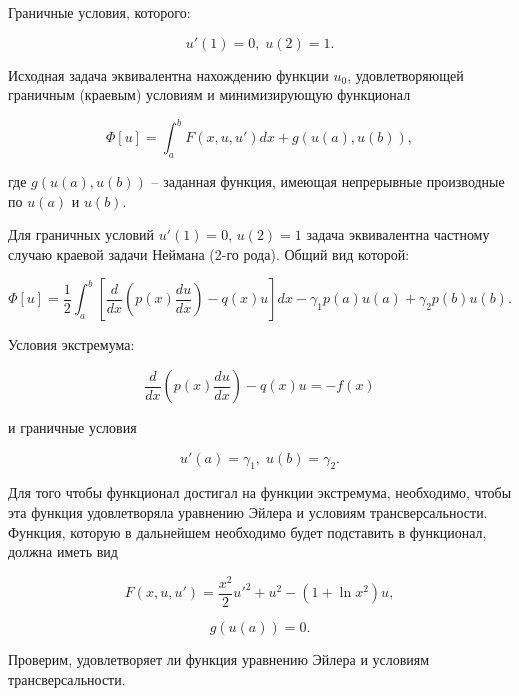 \documentclass{article}
\begin{document}
\noindent Граничные условия, которого:

\begin{displaymath}
	u'(1) = 0, \; u(2) = 1.
\end{displaymath}

Исходная задача эквивалентна нахождению функции $u_{0}$, удовлетворяющей граничным (краевым) условиям и минимизирующую функционал

\begin{displaymath}
	\Phi[u] = \int_{a}^{b} F(x, u, u')dx + g(u(a), u(b)),
\end{displaymath}

\noindent где $g(u(a), u(b))$ -- заданная функция, имеющая непрерывные производные по $u(a)$ и $u(b)$.

Для граничных условий $u'(1) = 0$, $u(2) = 1$ задача эквивалентна частному случаю краевой задачи Неймана (2-го рода). Общий вид которой:

\begin{displaymath}
	\Phi[u] = \frac{1}{2} \int_{a}^{b} \left[ \frac{d}{dx} \left( p(x) \frac{d u}{dx} \right) - q(x)u \right] dx - \gamma_{1} p(a) u(a) + \gamma_{2} p(b) u(b).
\end{displaymath}

\noindent Условия экстремума:

\begin{displaymath}
	\frac{d}{dx} \left( p(x) \frac{d u}{dx} \right) - q(x)u = -f(x)
\end{displaymath}

\noindent и граничные условия

\begin{displaymath}
	u'(a) = \gamma_{1}, \; u(b) = \gamma_{2}.
\end{displaymath}

Для того чтобы функционал достигал на функции экстремума, необходимо, чтобы эта функция удовлетворяла уравнению Эйлера и условиям трансверсальности. Функция, которую в дальнейшем необходимо будет подставить в функционал, должна иметь вид

\begin{equation}\label{equation_func_rank_2}
	F(x, u, u') = \frac{x^2}{2}u'^2 + u^2 - (1+\ln{x^2})u,
\end{equation}

\begin{displaymath}
	g(u(a)) = 0.
\end{displaymath}

\noindent Проверим, удовлетворяет ли функция уравнению Эйлера и условиям трансверсальности. 
\end{document}

